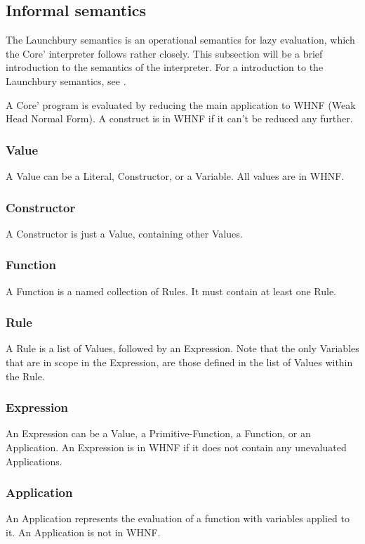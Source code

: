 \subsection{Informal semantics}

The Launchbury semantics is an operational semantics for 
lazy evaluation, which the Core' interpreter follows rather closely. 
This subsection will be a brief introduction to the semantics of the interpreter.
For a introduction to 
the Launchbury semantics, see \cite{launchbury1993natural}. 

A Core' program is evaluated by reducing the main application to WHNF 
(Weak Head Normal Form). A construct is in WHNF if it can't be
reduced any further.

\subsubsection{Value}
A Value can be a Literal, Constructor, or a Variable. All values are in WHNF.

\subsubsection{Constructor}
A Constructor is just a Value, containing other Values.

\subsubsection{Function}
A Function is a named collection of Rules. It must contain at least one Rule.

\subsubsection{Rule}
A Rule is a list of Values, followed by an Expression. Note that the only Variables
that are in scope in the Expression, are those defined in the list of Values within 
the Rule.

\subsubsection{Expression}
An Expression can be a Value, a Primitive-Function, a Function, or an Application.
An Expression is in WHNF if it does not contain any unevaluated Applications.

\subsubsection{Application}
An Application represents the evaluation of a function with variables applied to it.
An Application is not in WHNF.


